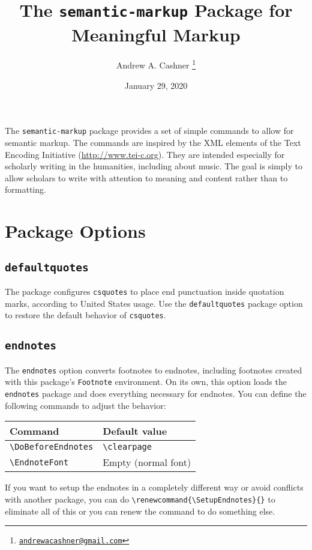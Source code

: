 \documentclass{article}
\title{The \texttt{semantic-markup} Package for Meaningful Markup}
\author{Andrew A. Cashner%
  \thanks{\href{mailto:andrewacashner@gmail.com}{\nolinkurl{andrewacashner@gmail.com}}}%
}
\date{January 29, 2020}
\begin{document}
\maketitle

The \texttt{semantic-markup} package provides a set of simple commands to allow for semantic markup.
The commands are inspired by the XML elements of the Text Encoding Initiative (\url{http://www.tei-c.org}).
They are intended especially for scholarly writing in the humanities, including about music.
The goal is simply to allow scholars to write with attention to meaning and content rather than to formatting.

\tableofcontents

\section{Package Options}

\subsection{\texttt{defaultquotes}}

The package configures \texttt{csquotes} to place end punctuation inside quotation marks, according to United States usage. 
Use the \texttt{defaultquotes} package option to restore the default behavior of \texttt{csquotes}.

\subsection{\texttt{endnotes}}

The \texttt{endnotes} option converts footnotes to endnotes, including footnotes created with this package's \texttt{Footnote} environment.
On its own, this option loads the \texttt{endnotes} package and does everything
necessary for endnotes.
You can define the following commands to adjust the behavior:

\begin{center}
\begin{tabular}{ll}
    Command & Default value \\ \hline
    \verb|\DoBeforeEndnotes| & \verb|\clearpage| \\
    \verb|\EndnoteFont| & Empty (normal font) \\
\end{tabular}
\end{center}

If you want to setup the endnotes in a completely different way or avoid
conflicts with another package, you can do
\verb|\renewcommand{\SetupEndnotes}{}| to eliminate all of this or you can renew
the command to do something else.
\end{document}

